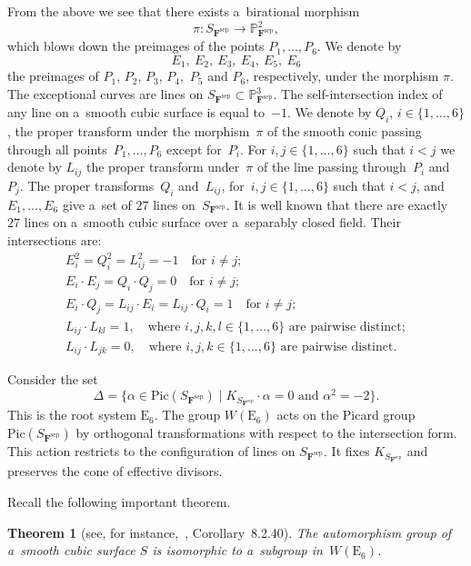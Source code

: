 \documentclass{amsart}
\numberwithin{equation}{section}
\theoremstyle{plain}
\newtheorem{theorem}{Theorem}
\theoremstyle{definition}
\theoremstyle{remark}
\begin{document}
From the above we see that there exists a~birational morphism
$$
\pi \colon S_{\mathbf{F}^{\mathrm{sep}}} \to \mathbb{P}^2_{\mathbf{F}^{\mathrm{sep}}},
$$
which blows down the preimages of the points $P_1,\dots, P_6$. We denote by
$$
E_1, \ E_2, \ E_3, \ E_4, \ E_5, \ E_6
$$
the preimages of $P_1$, $P_2$, $P_3$, $P_4$,~$P_5$ and $P_6$, respectively, under the morphism $\pi$. The exceptional curves are lines on $S_{\mathbf{F}^{\mathrm{sep}}} \subset \mathbb{P}^3_{\mathbf{F}^{\mathrm{sep}}}$. The self-intersection index of any line on a~smooth cubic surface is equal to~$-1$. We denote by $Q_i$, $i \in \{1, \dots, 6\}$, the proper transform under the morphism~$\pi$ of the smooth conic passing through all points~$P_1, \dots, P_6$ except for~$P_i$. For $i,j \in \{1, \dots, 6\}$ such that $i<j$ we denote by $L_{ij}$ the proper transform under~$\pi$ of the line passing through~$P_i$ and $P_j$. The proper transforms~$Q_i$ and~$L_{ij}$, for~$i,j \in \{1, \dots, 6\}$ such that $i<j$, and $E_1, \dots, E_6$ give a~set of $27$ lines on~$S_{\mathbf{F}^{\mathrm{sep}}}$. It is well known that there are exactly~$27$ lines on a~smooth cubic surface over a~separably closed field. Their intersections are:
\begin{gather*}
E_i^2=Q_i^2=L_{ij}^2=-1 \quad \text{for } i \neq j;
\\
E_i \cdot E_j=Q_i \cdot Q_j=0 \quad \text{for } i \neq j;
\\
E_i \cdot Q_j=L_{ij} \cdot E_i=L_{ij} \cdot Q_i=1 \quad \text{for } i \neq j;
\\
L_{ij} \cdot L_{kl}=1, \quad \text{where } i,j,k,l \in \{1,\dots,6\} \text{ are pairwise distinct};
\\
L_{ij} \cdot L_{jk}=0, \quad \text{where } i,j,k \in \{1,\dots,6\}\text{ are pairwise distinct}.
\end{gather*}

Consider the set
$$
\Delta=\{\alpha \in \mathrm{Pic}(S_{\mathbf{F}^{\mathrm{sep}}}) \mid K_{S_{\mathbf{F}^{\mathrm{sep}}}}\cdot \alpha=0 \text{ and } \alpha^2=-2 \}.
$$
This is the root system $\mathrm{E}_6$. The group $W(\mathrm{E}_6)$ acts on the Picard group~$\mathrm{Pic}(S_{\mathbf{F}^{\mathrm{sep}}})$ by orthogonal transformations with respect to the intersection form. This action restricts to the configuration of lines on $S_{\mathbf{F}^{\mathrm{sep}}}$. It fixes $K_{S_{\mathbf{F}^{\mathrm{sep}}}}$ and preserves the cone of effective divisors.

Recall the following important theorem.

\begin{theorem}[{see, for instance,~\cite{7}, Corollary~8.2.40}]
\label{t5}
The automorphism group of a~smooth cubic surface $S$ is isomorphic to a~subgroup in~$W(\mathrm{E}_6)$.
\end{theorem}
\end{document}
